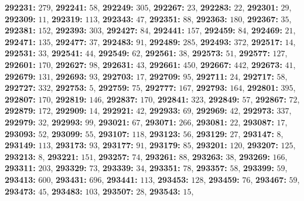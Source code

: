 \textsf{\bfseries 292231:} $279$, \textsf{\bfseries 292241:} $58$, \textsf{\bfseries 292249:} $305$, \textsf{\bfseries 292267:} $23$, \textsf{\bfseries 292283:} $22$, \textsf{\bfseries 292301:} $29$, \textsf{\bfseries 292309:} $11$, \textsf{\bfseries 292319:} $113$, \textsf{\bfseries 292343:} $47$, \textsf{\bfseries 292351:} $88$, \textsf{\bfseries 292363:} $180$, \textsf{\bfseries 292367:} $35$, \textsf{\bfseries 292381:} $152$, \textsf{\bfseries 292393:} $303$, \textsf{\bfseries 292427:} $84$, \textsf{\bfseries 292441:} $157$, \textsf{\bfseries 292459:} $84$, \textsf{\bfseries 292469:} $21$, \textsf{\bfseries 292471:} $135$, \textsf{\bfseries 292477:} $37$, \textsf{\bfseries 292483:} $91$, \textsf{\bfseries 292489:} $285$, \textsf{\bfseries 292493:} $372$, \textsf{\bfseries 292517:} $14$, \textsf{\bfseries 292531:} $33$, \textsf{\bfseries 292541:} $44$, \textsf{\bfseries 292549:} $62$, \textsf{\bfseries 292561:} $38$, \textsf{\bfseries 292573:} $51$, \textsf{\bfseries 292577:} $127$, \textsf{\bfseries 292601:} $170$, \textsf{\bfseries 292627:} $98$, \textsf{\bfseries 292631:} $43$, \textsf{\bfseries 292661:} $450$, \textsf{\bfseries 292667:} $442$, \textsf{\bfseries 292673:} $41$, \textsf{\bfseries 292679:} $131$, \textsf{\bfseries 292693:} $93$, \textsf{\bfseries 292703:} $17$, \textsf{\bfseries 292709:} $95$, \textsf{\bfseries 292711:} $24$, \textsf{\bfseries 292717:} $58$, \textsf{\bfseries 292727:} $332$, \textsf{\bfseries 292753:} $5$, \textsf{\bfseries 292759:} $75$, \textsf{\bfseries 292777:} $167$, \textsf{\bfseries 292793:} $164$, \textsf{\bfseries 292801:} $395$, \textsf{\bfseries 292807:} $170$, \textsf{\bfseries 292819:} $146$, \textsf{\bfseries 292837:} $170$, \textsf{\bfseries 292841:} $323$, \textsf{\bfseries 292849:} $57$, \textsf{\bfseries 292867:} $72$, \textsf{\bfseries 292879:} $172$, \textsf{\bfseries 292909:} $14$, \textsf{\bfseries 292921:} $42$, \textsf{\bfseries 292933:} $69$, \textsf{\bfseries 292969:} $42$, \textsf{\bfseries 292973:} $337$, \textsf{\bfseries 292979:} $32$, \textsf{\bfseries 292993:} $99$, \textsf{\bfseries 293021:} $67$, \textsf{\bfseries 293071:} $266$, \textsf{\bfseries 293081:} $22$, \textsf{\bfseries 293087:} $17$, \textsf{\bfseries 293093:} $52$, \textsf{\bfseries 293099:} $55$, \textsf{\bfseries 293107:} $118$, \textsf{\bfseries 293123:} $56$, \textsf{\bfseries 293129:} $27$, \textsf{\bfseries 293147:} $8$, \textsf{\bfseries 293149:} $113$, \textsf{\bfseries 293173:} $93$, \textsf{\bfseries 293177:} $91$, \textsf{\bfseries 293179:} $85$, \textsf{\bfseries 293201:} $120$, \textsf{\bfseries 293207:} $125$, \textsf{\bfseries 293213:} $8$, \textsf{\bfseries 293221:} $151$, \textsf{\bfseries 293257:} $74$, \textsf{\bfseries 293261:} $88$, \textsf{\bfseries 293263:} $38$, \textsf{\bfseries 293269:} $166$, \textsf{\bfseries 293311:} $203$, \textsf{\bfseries 293329:} $73$, \textsf{\bfseries 293339:} $34$, \textsf{\bfseries 293351:} $78$, \textsf{\bfseries 293357:} $58$, \textsf{\bfseries 293399:} $59$, \textsf{\bfseries 293413:} $600$, \textsf{\bfseries 293431:} $696$, \textsf{\bfseries 293441:} $113$, \textsf{\bfseries 293453:} $128$, \textsf{\bfseries 293459:} $76$, \textsf{\bfseries 293467:} $59$, \textsf{\bfseries 293473:} $45$, \textsf{\bfseries 293483:} $103$, \textsf{\bfseries 293507:} $28$, \textsf{\bfseries 293543:} $15$, 
